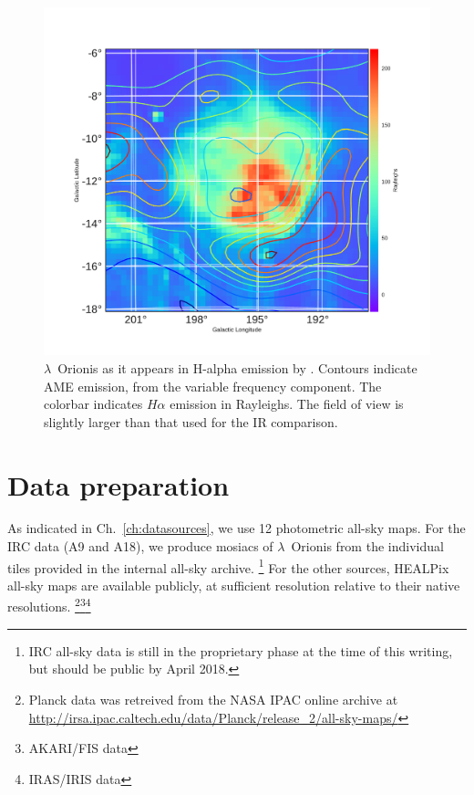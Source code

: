      \begin{figure}
       \includegraphics[width=\textwidth]{../Plots/ch_lori/LOri_halpha_AMEvarContours.pdf}
       \centering
       \caption{$\lambda$~Orionis as it appears in H-alpha emission by \cite{finkbeiner}. Contours indicate AME emission, from the variable frequency component. The colorbar indicates $H\alpha$ emission in Rayleighs. The field of view is slightly larger than that used for the IR comparison. }
       \label{fig:LOri_halpha_AMEvarContours}
     \end{figure}

	\section{Data preparation}
		As indicated in Ch.~\ref{ch:datasources}, we use 12 photometric all-sky maps. For the IRC data (A9 and A18), we produce mosiacs of $\lambda$~Orionis from the individual tiles provided in the internal all-sky archive.
      \footnote{IRC all-sky data is still in the proprietary phase at the time of this writing, but should be public by April 2018.}
       For the other sources, HEALPix all-sky maps are available publicly, at sufficient resolution relative to their native resolutions. \footnote{Planck data was retreived from the NASA IPAC online archive at \url{http://irsa.ipac.caltech.edu/data/Planck/release_2/all-sky-maps/}}\footnote{AKARI/FIS data }\footnote{IRAS/IRIS data }

